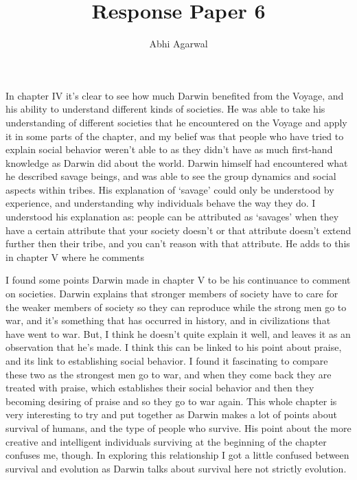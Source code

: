 \documentclass[11pt, oneside]{article}
\title{Response Paper 6}
\author{Abhi Agarwal}
\date{}
\begin{document}
\maketitle

\par In chapter IV it's clear to see how much Darwin benefited from the Voyage, and his ability to understand different kinds of societies. He was able to take his understanding of different societies that he encountered on the Voyage and apply it in some parts of the chapter, and my belief was that people who have tried to explain social behavior weren't able to as they didn't have as much first-hand knowledge as Darwin did about the world. Darwin himself had encountered what he described savage beings, and was able to see the group dynamics and social aspects within tribes. His explanation of `savage' could only be understood by experience, and understanding why individuals behave the way they do. I understood his explanation as: people can be attributed as `savages' when they have a certain attribute that your society doesn't or that attribute doesn't extend further then their tribe, and you can't reason with that attribute. He adds to this in chapter V where he comments 

\par I found some points Darwin made in chapter V to be his continuance to comment on societies. Darwin explains that stronger members of society have to care for the weaker members of society so they can reproduce while the strong men go to war, and it's something that has occurred in history, and in civilizations that have went to war. But, I think he doesn't quite explain it well, and leaves it as an observation that he's made. I think this can be linked to his point about praise, and its link to establishing social behavior. I found it fascinating to compare these two as the strongest men go to war, and when they come back they are treated with praise, which establishes their social behavior and then they becoming desiring of praise and so they go to war again. This whole chapter is very interesting to try and put together as Darwin makes a lot of points about survival of humans, and the type of people who survive. His point about the more creative and intelligent individuals surviving at the beginning of the chapter confuses me, though. In exploring this relationship I got a little confused between survival and evolution as Darwin talks about survival here not strictly evolution.
\end{document}
